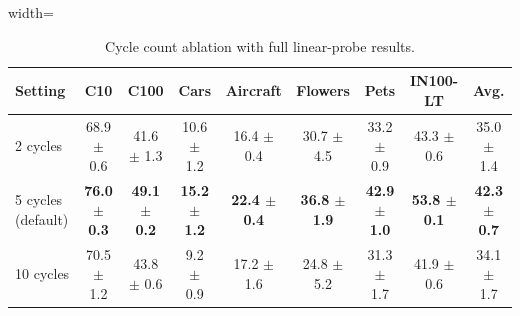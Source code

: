 \begin{table}[H]
\centering
\scriptsize
\setlength{\tabcolsep}{3.5pt}
\caption{Cycle count ablation with full linear-probe results.}
\label{tab:app_cycles_linear}
\begin{adjustbox}{width=\textwidth}
\begin{tabular}{l c c c c c c c c}
\toprule
Setting & C10 & C100 & Cars & Aircraft & Flowers & Pets & IN100-LT & Avg. \\
\midrule
2 cycles & 68.9 {\scriptsize$\pm$ 0.6} & 41.6 {\scriptsize$\pm$ 1.3} & 10.6 {\scriptsize$\pm$ 1.2} & 16.4 {\scriptsize$\pm$ 0.4} & 30.7 {\scriptsize$\pm$ 4.5} & 33.2 {\scriptsize$\pm$ 0.9} & 43.3 {\scriptsize$\pm$ 0.6} & 35.0 {\scriptsize$\pm$ 1.4} \\
5 cycles (default) & \textbf{76.0 {\scriptsize$\pm$ 0.3}} & \textbf{49.1 {\scriptsize$\pm$ 0.2}} & \textbf{15.2 {\scriptsize$\pm$ 1.2}} & \textbf{22.4 {\scriptsize$\pm$ 0.4}} & \textbf{36.8 {\scriptsize$\pm$ 1.9}} & \textbf{42.9 {\scriptsize$\pm$ 1.0}} & \textbf{53.8 {\scriptsize$\pm$ 0.1}} & \textbf{42.3 {\scriptsize$\pm$ 0.7}} \\
10 cycles & 70.5 {\scriptsize$\pm$ 1.2} & 43.8 {\scriptsize$\pm$ 0.6} & 9.2 {\scriptsize$\pm$ 0.9} & 17.2 {\scriptsize$\pm$ 1.6} & 24.8 {\scriptsize$\pm$ 5.2} & 31.3 {\scriptsize$\pm$ 1.7} & 41.9 {\scriptsize$\pm$ 0.6} & 34.1 {\scriptsize$\pm$ 1.7} \\
\bottomrule
\end{tabular}
\end{adjustbox}
\end{table}
